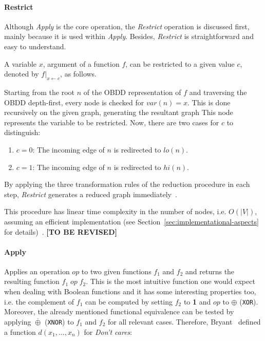 \documentclass{vldb}
\newcommand{\tbr}{\textbf{[TO BE REVISED]}}
\begin{document}
\paragraph*{Restrict}
\mbox{} %

Although \textit{Apply} is the core operation, the \textit{Restrict} operation is
discussed first, mainly because it is used within \textit{Apply}. Besides,
\textit{Restrict} is straightforward and easy to understand.

A variable $x$, argument of a function $f$, can be restricted to a given value
$c$, denoted by $f|_{x\leftarrow c}$, as follows.

Starting from the root $n$ of the OBDD representation of $f$ and traversing the
OBDD depth-first, every node is checked for $var(n) = x$. This is done recursively
on the given graph, generating the resultant graph This node represents
the variable to be restricted. Now, there are two cases for $c$ to distinguish:
\begin{enumerate}
    \item{$c=0$: The incoming edge of $n$ is redirected to $lo(n)$.}
    \item{$c=1$: The incoming edge of $n$ is redirected to $hi(n)$.}
\end{enumerate}

By applying the three transformation rules of the reduction procedure in each
step, \textit{Restrict} generates a reduced graph immediately~\cite{BRYANT92}.

This procedure has linear time complexity in the number of nodes, i.e. $O(|V|)$,
assuming an efficient implementation (see
Section~\ref{sec:implementational-aspects} for details)~\cite{BRYANT92}. 
\tbr

\paragraph*{Apply}
\mbox{} %

Applies an operation $op$ to two given functions $f_1$ and $f_2$ and returns the
resulting function $f_1\;op\;f_2$. This is the most intuitive function one would
expect when dealing with Boolean functions and it has some interesting properties
too, i.e. the complement of $f_1$ can be computed by setting $f_2$ to \textbf{1}
and $op$ to $\oplus$ (\texttt{XOR}). Moreover, the already mentioned functional
equivalence can be tested by applying $\overline{\oplus}$ (\texttt{XNOR}) to
$f_1$ and $f_2$ for all relevant cases. Therefore, Bryant~\cite{BRYANT92} defined
a function $d(x_1, \ldots, x_n)$ for \textit{Don't cares}:
\end{document}
